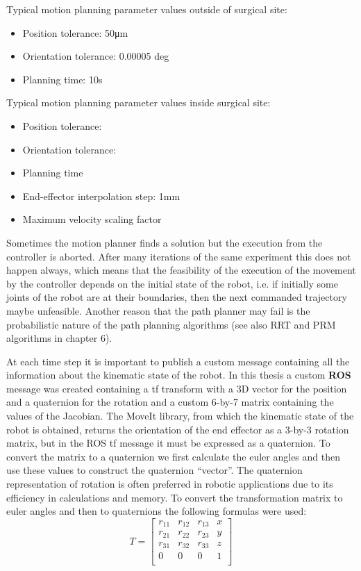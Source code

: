 Typical motion planning parameter values outside of surgical site:
\begin{itemize}
	\item Position tolerance: 50μm
	\item Orientation tolerance: 0.00005 deg
	\item Planning time: 10s
\end{itemize}

Typical motion planning parameter values inside surgical site:
\begin{itemize}
	\item Position tolerance:
	\item Orientation tolerance:
	\item Planning time
	\item End-effector interpolation step: 1mm
	\item Maximum velocity scaling factor
\end{itemize}

Sometimes the motion planner finds a solution but the execution from the controller is aborted. 
After many iterations of the same experiment this does not happen always, which means that the 
feasibility of the execution of the movement by the controller depends on the initial state of 
the robot, i.e. if initially some joints of the robot are at their boundaries, then the next 
commanded trajectory maybe unfeasible. Another reason that the path planner may fail is the 
probabilistic nature of the path planning algorithms (see also RRT and PRM algorithms in chapter 6).

At each time step it is important to publish a custom message containing all the information 
about the kinematic state of the robot. In this thesis a custom \textbf{ROS} message was created 
containing a tf transform with a 3D vector for the position and a quaternion for the rotation and 
a custom  6-by-7 matrix containing the values of the Jacobian. The MoveIt library, from which the 
kinematic state of the robot is obtained, returns the orientation of the end effector as a 3-by-3 
rotation matrix, but in the ROS tf message it must be expressed as a quaternion. To convert the 
matrix to a quaternion we first calculate the euler angles and then use these values to construct 
the quaternion “vector”. The quaternion representation of rotation is often preferred in robotic 
applications due to its efficiency in calculations and memory. To convert the transformation 
matrix to euler angles and then to quaternions the following formulas were used:
\[
T = 
\begin{bmatrix}
r_{11} & r_{12} & r_{13} & x \\
r_{21} & r_{22} & r_{23} & y \\
r_{31} & r_{32} & r_{33} & z \\
0 & 0 & 0 & 1\\
\end{bmatrix}
\]

